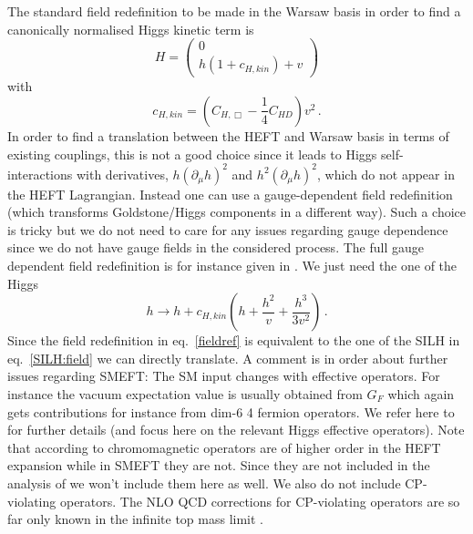 \documentclass[12pt]{article}
\begin{document}
The standard field redefinition to be made in the Warsaw basis in order to find a canonically normalised Higgs kinetic term is
\begin{equation}
H=\left( \begin{array}{c} 0 \\ h(1+c_{H,kin}) + v \end{array} \right)
\end{equation} 
with 
\begin{equation}
c_{H,kin}=\left(C_{H,\Box}-\frac{1}{4}C_{HD}\right) v^2\,.
\end{equation}
In order to find a translation between the HEFT and Warsaw basis in terms of existing couplings, this is not a good choice since it leads  to Higgs self-interactions with derivatives, $h(\partial_{\mu}h)^2$ and $h^2(\partial_{\mu}h)^2$, which do not appear in the HEFT Lagrangian.  Instead one can use a gauge-dependent field redefinition (which transforms Goldstone/Higgs components in a different way). Such a choice is tricky but we do not need to care for any issues regarding gauge dependence since we do not have gauge fields in the considered process. The full gauge dependent field redefinition is for instance given in \cite{Hartmann:2015aia}. We just need the one of the Higgs  
\begin{equation}
h \to h + c_{H,kin}\left( h +\frac{h^2}{v}+\frac{h^3}{3v^2}\right)\,. \label{fieldref}
\end{equation}
Since the field redefinition in eq.~\eqref{fieldref} is equivalent to the one of the SILH in eq.~\eqref{SILH:field} we can directly translate.
A comment is in order about further issues regarding SMEFT: The SM input changes with effective operators. For instance the vacuum expectation value is usually obtained from $G_F$ which again gets contributions for instance from dim-6 4 fermion operators. We refer here to \cite{Brivio:2017vri} for further details (and focus here on the relevant Higgs effective operators).
Note that according to \cite{Buchalla:2018yce} chromomagnetic operators are of higher order in the HEFT expansion while in SMEFT they are not. Since they are not included in the analysis of  \cite{Buchalla:2018yce} we won't include them here as well. We also do not include CP-violating operators. The NLO QCD corrections for CP-violating operators are so far only known in the infinite top mass limit \cite{Grober:2017gut}.
\end{document}
